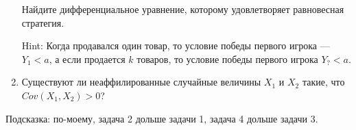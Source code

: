 \documentclass[pdftex,12pt,a4paper]{article}
\begin{document}
\begin{enumerate}
Найдите дифференциальное уравнение, которому удовлетворяет равновесная стратегия.

Hint: Когда продавался один товар, то условие победы первого игрока --- $ Y_{1}<a $, а если продается $ k $ товаров, то условие победы первого игрока $ Y_{?}<a $.



\item Существуют ли неаффилированные случайные величины $ X_{1} $ и $ X_{2} $ такие, что $Cov(X_{1},X_{2})>0  $?


\end{enumerate}


Подсказка: по-моему, задача 2 дольше задачи 1, задача 4 дольше задачи 3.



\printindex %
\end{document}
